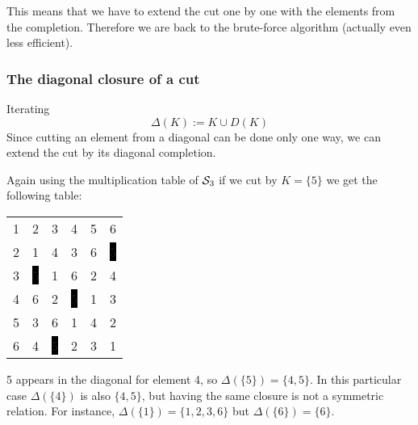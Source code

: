 \documentclass{beamer}
\newcommand{\cS}{{\cal S}}
\begin{document}
\begin{frame}
\begin{center}
\begin{tabular}{@{}c@{}c@{}c@{}c@{}c@{}c@{}}
\end{tabular}%
\end{center} 

This means that we have to extend the cut one by one with the elements from the completion. Therefore we are back to the brute-force algorithm (actually even less efficient).
\end{frame}

\begin{frame}\frametitle{The diagonal closure of a cut}
Iterating 
$$ \Delta(K):=K\cup D(K)$$
Since cutting an element from a diagonal can be done only one way, we can extend the cut by its diagonal completion.

Again using the multiplication table of $\cS_3$ if we cut by $K=\{5\}$ we get the following table:
\begin{center}
\begin{tabular}{@{}c@{}c@{}c@{}c@{}c@{}c@{}}
1&2&3&4&\color{lgr}5&6\\
2&1&4&3&\color{lgr}6&\color{white}\colorbox{black}{5}\\
3&\color{white}\colorbox{black}{5}&1&6&\color{lgr}2&4\\
4&6&2&\color{white}\colorbox{black}{5}&\color{lgr}1&3\\
\color{lgr}5&\color{lgr}3&\color{lgr}6&\color{lgr}1&\color{lgr}4&\color{lgr}2\\
6&4&\color{white}\colorbox{black}{5}&2&\color{lgr}3&1\\
\end{tabular}
\end{center}
5 appears in the diagonal for element 4, so $\Delta(\{5\})=\{4,5\}$. In this particular case $\Delta(\{4\})$ is also $\{4,5\}$, but having the same closure is not a symmetric relation. For instance, $\Delta(\{1\})=\{1,2,3,6\}$ but $\Delta(\{6\})=\{6\}$. 

\end{frame}
\end{document}
